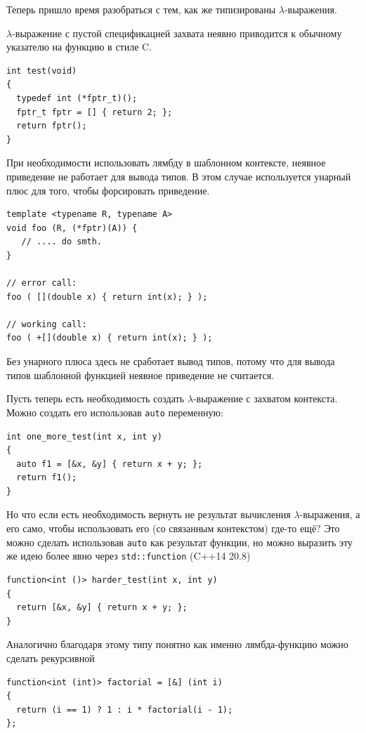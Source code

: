\documentclass[a4paper,12pt,oneside]{article}
\begin{document}
Теперь пришло время разобраться с тем, как же типизированы $\lambda$-выражения.

$\lambda$-выражение с пустой спецификацией захвата неявно приводится к обычному указателю на функцию в стиле C.

\begin{lstlisting}
int test(void)
{
  typedef int (*fptr_t)();
  fptr_t fptr = [] { return 2; };
  return fptr();
}
\end{lstlisting}

При необходимости использовать лямбду в шаблонном контексте, неявное приведение не работает для вывода типов. В этом случае используется унарный плюс для того, чтобы форсировать приведение.

\begin{lstlisting}
template <typename R, typename A>
void foo (R, (*fptr)(A)) {
   // .... do smth.
}

// error call:
foo ( [](double x) { return int(x); } );

// working call:
foo ( +[](double x) { return int(x); } );
\end{lstlisting}

Без унарного плюса здесь не сработает вывод типов, потому что для вывода типов шаблонной функцией неявное приведение не считается.

Пусть теперь есть необходимость создать $\lambda$-выражение с захватом контекста. Можно создать его использовав \lstinline!auto! переменную:

\begin{lstlisting}
int one_more_test(int x, int y)
{
  auto f1 = [&x, &y] { return x + y; };
  return f1(); 
}
\end{lstlisting}

Но что если есть необходимость вернуть не результат вычисления $\lambda$-выражения, а его само, чтобы использовать его (со связанным контекстом) где-то ещё? Это можно сделать использовав \lstinline!auto! как результат функции, но можно выразить эту же идею более явно через \lstinline!std::function! (C++14 20.8)
 
\begin{lstlisting}
function<int ()> harder_test(int x, int y)
{
  return [&x, &y] { return x + y; };
}
\end{lstlisting}

Аналогично благодаря этому типу понятно как именно лямбда-функцию можно сделать рекурсивной

\begin{lstlisting}
function<int (int)> factorial = [&] (int i) 
{ 
  return (i == 1) ? 1 : i * factorial(i - 1); 
};
\end{lstlisting}
\end{document}
